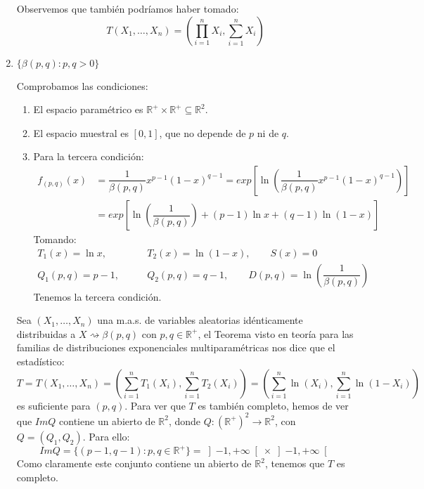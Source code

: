 \begin{ejercicio}
\begin{enumerate}[label=\alph*)]
            Observemos que también podríamos haber tomado:
            \begin{equation*}
                T(X_1, \ldots, X_n) = \left(\prod_{i=1}^n X_i, \sum_{i=1}^n X_i\right)
            \end{equation*} %
        \item $\{\beta(p,q) : p,q>0\}$

            Comprobamos las condiciones:
            \begin{enumerate}[label=\arabic*.]
                \item El espacio paramétrico es $\mathbb{R}^+\times \mathbb{R}^+\subseteq \mathbb{R}^2$.
                \item El espacio muestral es $[0,1]$, que no depende de $p$ ni de $q$.
                \item Para la tercera condición:
                    \begin{align*}
                        f_{(p,q)}(x) &= \dfrac{1}{\beta(p,q)}x^{p-1}{(1-x)}^{q-1} = exp\left[\ln\left(\dfrac{1}{\beta(p,q)}x^{p-1}{(1-x)}^{q-1} \right)\right] \\
                                     &= exp\left[\ln\left(\dfrac{1}{\beta(p,q)}\right) + (p-1)\ln x + (q-1)\ln(1-x)\right]
                    \end{align*}
                Tomando:
                \begin{align*}
                    T_1(x) = \ln x, &\qquad T_2(x) = \ln(1-x), \qquad S(x) = 0 \\
                    Q_1(p,q) = p-1, &\qquad Q_2(p,q) = q-1, \qquad D(p,q) = \ln\left(\dfrac{1}{\beta(p,q)}\right) 
                \end{align*}
                Tenemos la tercera condición.
            \end{enumerate}
            Sea $(X_1, \ldots, X_n)$ una m.a.s. de variables aleatorias idénticamente distribuidas a $X\rightsquigarrow \beta(p,q)$ con $p,q\in \mathbb{R}^+$, el Teorema visto en teoría para las familias de distribuciones exponenciales multiparamétricas nos dice que el estadístico:
            \begin{equation*}
                T = T(X_1, \ldots, X_n) = \left(\sum_{i=1}^{n}T_1(X_i), \sum_{i=1}^{n}T_2(X_i)\right) = \left(\sum_{i=1}^{n}\ln(X_i), \sum_{i=1}^{n}\ln(1-X_i)\right)
            \end{equation*}
            es suficiente para $(p,q)$. Para ver que $T$ es también completo, hemos de ver que $Im Q$ contiene un abierto de $\mathbb{R}^2$, donde $Q:{(\mathbb{R}^+)}^{2}\to \mathbb{R}^2$, con $Q=(Q_1,Q_2)$. Para ello:
            \begin{equation*}
                Im Q = \{(p-1,q-1):p,q\in \mathbb{R}^+\} = \left]-1,+\infty\right[\times \left]-1,+\infty\right[
            \end{equation*}
            Como claramente este conjunto contiene un abierto de $\mathbb{R}^2$, tenemos que $T$ es completo.
    \end{enumerate}
\end{ejercicio}

